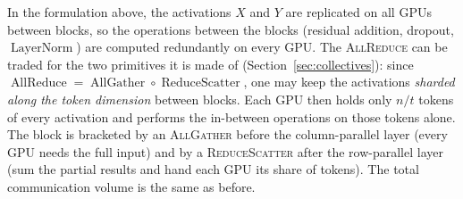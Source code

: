 \documentclass[11pt,a4paper]{article}
\theoremstyle{definition}
\theoremstyle{remark}
\theoremstyle{plain}
\DeclareMathOperator*{\AllReduce}{AllReduce}
\DeclareMathOperator*{\AllGather}{AllGather}
\DeclareMathOperator*{\ReduceScatter}{ReduceScatter}
\DeclareMathOperator{\LayerNorm}{LayerNorm}
\begin{document}
In the formulation above, the activations $X$ and $Y$ are replicated on
all GPUs between blocks, so the operations between the blocks (residual
addition, dropout, $\LayerNorm$) are computed redundantly on every GPU.
The \textsc{AllReduce} can be traded for the two primitives it is made of
(Section~\ref{sec:collectives}): since $\AllReduce=\AllGather\circ
\ReduceScatter$, one may keep the activations \emph{sharded along the
token dimension} between blocks. Each GPU then holds only $n/t$ tokens of
every activation and performs the in-between operations on those tokens
alone. The block is bracketed by an \textsc{AllGather} before the
column-parallel layer (every GPU needs the full input) and by a
\textsc{ReduceScatter} after the row-parallel layer (sum the partial
results and hand each GPU its share of tokens). The total communication volume is the same as before.
\end{document}
